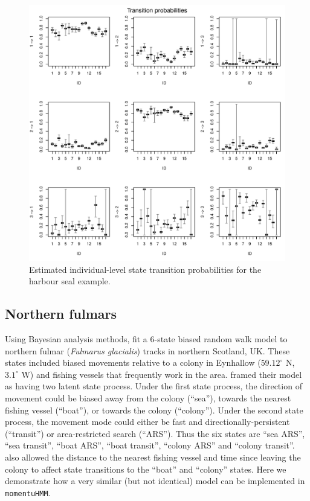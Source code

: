 \documentclass[12pt]{article}\usepackage[]{graphicx}\usepackage[]{color}
\begin{document}
\begin{figure}[htbp]
  \centering
  \includegraphics[width=\textwidth]{plot_harbourSealResults020}
  \caption{Estimated individual-level state transition probabilities for the harbour seal example.}
  \label{fig:hsTPM}
\end{figure}

\subsection{Northern fulmars}
\label{sec:northernFulmar}
Using Bayesian analysis methods, \cite{PirottaEtAl2018} fit a 6-state biased random walk model to northern fulmar ({\it Fulmarus glacialis}) tracks in northern Scotland, UK.  These states included biased movements relative to a colony in Eynhallow ($59.12^\circ$ N, $3.1^\circ$ W) and fishing vessels that frequently work in the area.  \cite{PirottaEtAl2018} framed their model as having two latent state process.  Under the first state process, the direction of movement could be biased away from the colony (``sea''), towards the nearest fishing vessel (``boat''), or towards the colony (``colony''). Under the second state process, the movement mode could either be fast and directionally-persistent (``transit'') or area-restricted search (``ARS'').  Thus the six states are ``sea ARS'', ``sea transit'', ``boat ARS'', ``boat transit'', ``colony ARS'' and ``colony transit''. \cite{PirottaEtAl2018} also allowed the distance to the nearest fishing vessel and time since leaving the colony to affect state transitions to the ``boat'' and ``colony'' states.  Here we demonstrate how a very similar (but not identical) model can be implemented in \verb|momentuHMM|.
\end{document}
